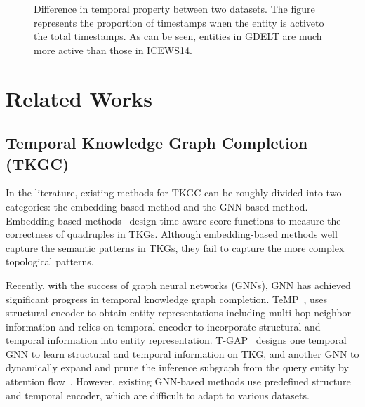 \documentclass[11pt]{article}
\begin{document}
\begin{figure}[!h]
	\vspace{-10px}
\caption{Difference in temporal property between two datasets.
		The figure represents the proportion of timestamps when the entity is active\footnotemark to the total timestamps. As can be seen, entities in GDELT are much more active than those in ICEWS14.} 
	\label{fig-data_property}
	\vspace{-10px}
\end{figure}

\section{Related Works}

\subsection{Temporal Knowledge Graph Completion (TKGC)}
 
In the literature, 
existing methods for TKGC can be roughly divided into two categories: the embedding-based method and the GNN-based method. 
Embedding-based methods~\citep{leblay2018deriving,dasgupta-etal-2018-hyte,goel2020diachronic,lacroix2020tensor, messner2022temporal}
design time-aware score functions to measure the correctness of quadruples in TKGs. 
Although embedding-based methods well capture the semantic patterns in TKGs, 
they fail to capture the more complex topological patterns.

Recently, 
with the success of graph neural networks (GNNs), 
GNN has achieved significant progress in temporal knowledge graph completion. 
TeMP~\citep{wu-etal-2020-temp},
uses structural encoder to obtain entity representations including multi-hop neighbor information 
and relies on temporal encoder to incorporate structural and temporal information into entity representation. 
T-GAP~\citep{jung2021learning} designs one temporal GNN to learn structural and temporal information on TKG, 
and another GNN to dynamically expand and prune the inference subgraph from the query entity  by attention flow~\citep{xu2018modeling}. 
However, 
existing GNN-based methods use predefined structure and temporal encoder, 
which are difficult to adapt to various datasets. 
\end{document}
